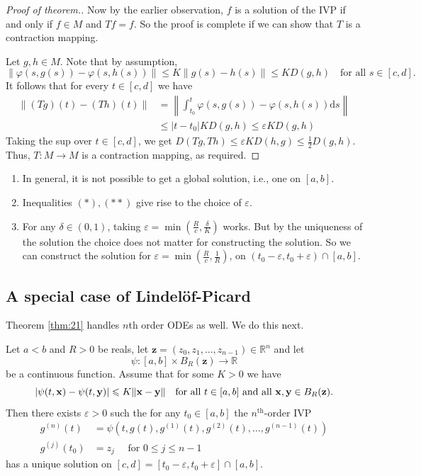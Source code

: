 \documentclass[a4paper]{article}
\renewcommand{\epsilon}{\varepsilon}
\begin{document}
\begin{proof}[Proof of theorem.]
    Now by the earlier observation, $f$ is a solution of the IVP if and only if $f \in M$ and $T f=f$. So the proof is complete if we can show that $T$ is a contraction mapping.

    Let $g, h \in M$. Note that by assumption,
    \[
    \|\varphi(s, g(s))-\varphi(s, h(s))\| \leqslant K\|g(s)-h(s)\| \leqslant K D(g, h) \quad \text {for all } s \in[c, d].
    \]
    It follows that for every $t \in[c, d]$ we have
    \begin{align*}
        \|(T g)(t)-(T h)(t)\| &=\left\|\int_{t_0}^t \varphi(s, g(s))-\varphi(s, h(s)) \mathrm{d} s\right\| \\
    & \leqslant\left|t-t_0\right| K D(g, h) \leqslant \varepsilon K D(g, h) \tag{$**$}
    \end{align*}
    Taking the sup over $t \in[c, d]$, we get $D(T g, T h) \leqslant \varepsilon K D(h, g) \leqslant \frac{1}{2} D(g, h)$. Thus, $T: M \rightarrow M$ is a contraction mapping, as required.
\end{proof}
\begin{remark}
    \begin{enumerate}
        \item In general, it is not possible to get a global solution, i.e., one on $[a, b]$.
        \item Inequalities $ (*),(* *) $ give rise to the choice of $ \epsilon $. 
        \item For any $\delta \in(0,1)$, taking $\varepsilon=\min \left(\frac{R}{c}, \frac{\delta}{K}\right)$ works. But by the uniqueness of the solution the choice does not matter for constructing the solution. So we can construct the solution for $\varepsilon=\min \left(\frac{R}{c}, \frac{1}{R}\right)$, on $\left(t_0-\varepsilon, t_0+\varepsilon\right) \cap[a, b]$.
    \end{enumerate}
\end{remark}

\subsection{A special case of Lindel\"of-Picard}
Theorem \ref{thm:21} handles $ n $th order ODEs as well. We do this next.

\begin{example}
    Let $a<b$ and $R>0$ be reals, let $\mathbf z=\left(z_0, z_1, \ldots, z_{n-1}\right) \in \mathbb{R}^n$ and let
\[
\psi:[a, b] \times B_R(\mathbf z) \rightarrow \mathbb{R}
\]
be a continuous function. Assume that for some $K>0$ we have
\[
|\psi(t, {\bf x})-\psi(t, {\bf y})| \leqslant K\|{\bf x}-{\bf y}\| \quad \text {for all } t \in[a, b] \text { and all } {\bf x}, {\bf y} \in B_R({\bf z}) .
\]
Then there exists $\varepsilon>0$ such the for any $t_0 \in[a, b]$ the $n^{\text {th}}$-order IVP
\[
\begin{aligned}
g^{(n)}(t) &=\psi\left(t, g(t), g^{(1)}(t), g^{(2)}(t), \ldots, g^{(n-1)}(t)\right) \\
g^{(j)}\left(t_0\right) &=z_j \quad \text { for } 0 \leqslant j \leqslant n-1
\end{aligned}
\]
has a unique solution on $[c, d]=\left[t_0-\varepsilon, t_0+\varepsilon\right] \cap[a, b]$.
\end{example}
\end{document}
